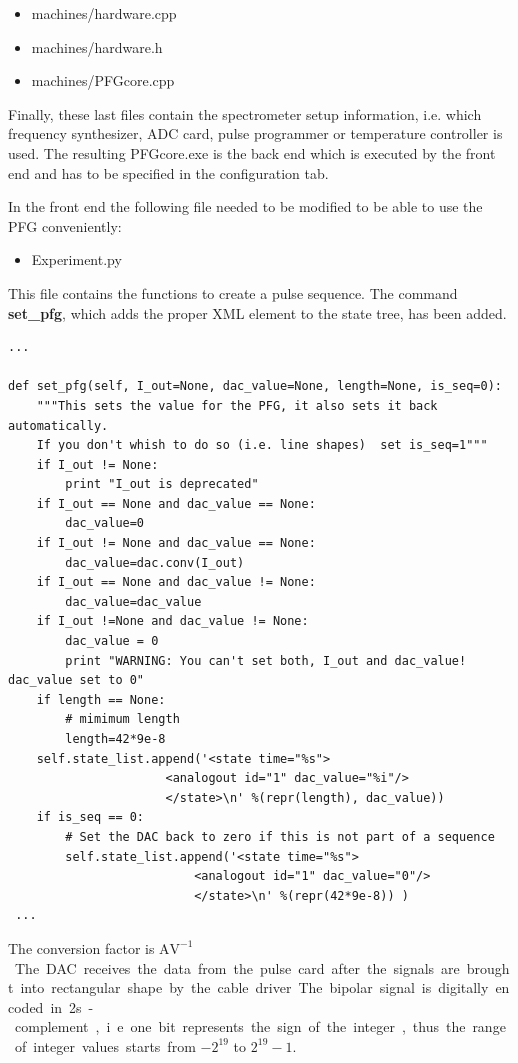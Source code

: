 \documentclass[12pt, a4paper, BCOR10mm, twoside, titlepage, headinclude]{scrbook}
\begin{document}
\begin{itemize}
\item machines/hardware.cpp
\item machines/hardware.h
\item machines/PFGcore.cpp
\end{itemize}
Finally, these last files contain the spectrometer setup information, i.e. which frequency synthesizer, ADC card, pulse programmer or temperature controller is used. The resulting PFGcore.exe is the back end which is executed by the front end and has to be specified in the configuration tab.


In the front end the following file needed to be modified to be able to use the PFG conveniently:
\begin{itemize}
\item Experiment.py
\end{itemize}
This file contains the functions to create a pulse sequence. The command \textbf{set\_pfg}, which adds the proper \textsf{XML} element to the state tree, has been added.
\begin{lstlisting}
...

def set_pfg(self, I_out=None, dac_value=None, length=None, is_seq=0):
	"""This sets the value for the PFG, it also sets it back automatically.
	If you don't whish to do so (i.e. line shapes)  set is_seq=1"""
	if I_out != None:
		print "I_out is deprecated"
	if I_out == None and dac_value == None:
	    dac_value=0
	if I_out != None and dac_value == None:
	    dac_value=dac.conv(I_out)
	if I_out == None and dac_value != None:
	    dac_value=dac_value
	if I_out !=None and dac_value != None:
	    dac_value = 0
	    print "WARNING: You can't set both, I_out and dac_value! dac_value set to 0"
	if length == None:
	    # mimimum length
	    length=42*9e-8
	self.state_list.append('<state time="%s">
					  <analogout id="1" dac_value="%i"/>
					  </state>\n' %(repr(length), dac_value))
	if is_seq == 0:
	    # Set the DAC back to zero if this is not part of a sequence 
	    self.state_list.append('<state time="%s">
					      <analogout id="1" dac_value="0"/>
					      </state>\n' %(repr(42*9e-8)) )
 ...
\end{lstlisting}
The conversion factor is \unit[50]{$\textrm{AV}^{-1}$}. The DAC receives the data from the pulse card after the signals are brought into rectangular shape by the cable driver. The bipolar signal is digitally encoded in 2s-complement , i.e. one bit represents the sign of the integer, thus the range of integer values starts from $\mathrm{-2^{19}}$ to $\mathrm{2^{19}-1}$. 
\end{document}
